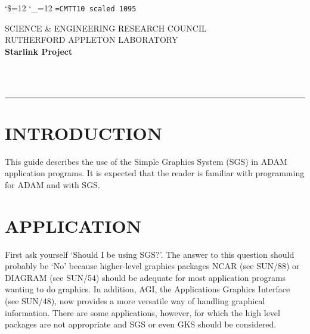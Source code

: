 \newcommand {\mandescriptionitem}[1]{\item [#1]}

\newcommand {\mantt}{\tt}

\newcommand {\manheadstyle}{}

\catcode`\$=12 \catcode`\_=12
\font\tt=CMTT10 scaled 1095


\thispagestyle{empty}
SCIENCE \& ENGINEERING RESEARCH COUNCIL \hfill \stardocname\\
RUTHERFORD APPLETON LABORATORY\\
{\large\bf Starlink Project\\}
{\large\bf \stardoccategory\ \stardocnumber}
\begin{flushright}
\stardocauthors\\
\stardocdate
\end{flushright}
\vspace{-4mm}
\rule{\textwidth}{0.5mm}
\vspace{5mm}
\begin{center}
{\Large\bf \stardoctitle}
\end{center}
\vspace{5mm}


\section{INTRODUCTION}
This guide describes the use of the Simple Graphics System (SGS)
in ADAM application programs.
It is expected that the reader is familiar with programming for
ADAM and with SGS.

\section{APPLICATION}
First ask yourself `Should I be using SGS?'.
The answer to this question should probably be `No' because higher-level
graphics packages  NCAR (see SUN/88) or DIAGRAM (see SUN/54) should be
adequate for most application programs wanting to do graphics.
In addition, AGI, the Applications Graphics Interface (see SUN/48), now
provides a more versatile way of handling graphical information.
There are some applications, however, for which the high level packages are
not appropriate and SGS or even GKS should be considered.

